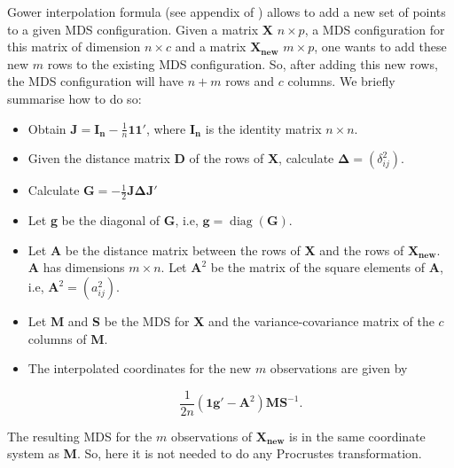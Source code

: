 \documentclass[11pt]{report}
\DeclareMathOperator{\diag}{diag}
\begin{document}
Gower interpolation formula (see appendix of \cite{gowerformula}) allows to add 
a new set of points to a given MDS configuration. Given a matrix 
\textbf{X} $n \times p$, a MDS configuration for this matrix of dimension 
$n \times c$ and a matrix $\mathbf{X_{new}}$ $m \times p$, one wants to 
add these new $m$ rows to the existing MDS configuration. So, 
after adding this new rows, the MDS configuration will have $n+m$ rows and 
$c$ columns. We briefly summarise how to do so:

\begin{itemize}

\item Obtain $\mathbf{J} = \mathbf{I_n} - \frac{1}{n}\mathbf{1}\mathbf{1}'$,
where $\mathbf{I_n}$ is the identity matrix $n \times n$.

\item Given the distance matrix \textbf{D} of the rows of \textbf{X},
calculate $\mathbf{\Delta} = (\delta_{ij}^2)$.

\item Calculate $\mathbf{G} = - \frac{1}{2} \mathbf{J} \mathbf{\Delta} \mathbf{J}'$

\item Let \textbf{g} be the diagonal of \textbf{G}, i.e, 
$\mathbf{g} = \diag({\mathbf{G}})$.

\item Let \textbf{A} be the distance matrix between the rows of 
\textbf{X} and the rows of $\mathbf{X_{new}}$. \textbf{A} has dimensions 
$m \times n$. Let $\mathbf{A}^2$ be the matrix of the square elements 
of \textbf{A}, i.e, $\mathbf{A}^2 = (a_{ij}^2)$.

\item Let \textbf{M} and \textbf{S} be the MDS for \textbf{X} and the 
variance-covariance matrix of the $c$ columns of \textbf{M}.

\item The interpolated coordinates for the new $m$ observations are given by

\begin{equation} \label{gower_f}
\frac{1}{2n} (\mathbf{1}\mathbf{g}' - \mathbf{A}^2) \mathbf{M}\mathbf{S}^{-1}.
\end{equation}

\end{itemize}

The resulting MDS for the $m$ observations of $\mathbf{X_{new}}$ is in the same
coordinate system as \textbf{M}. So, here it is not needed to do any 
Procrustes transformation.
\end{document}
